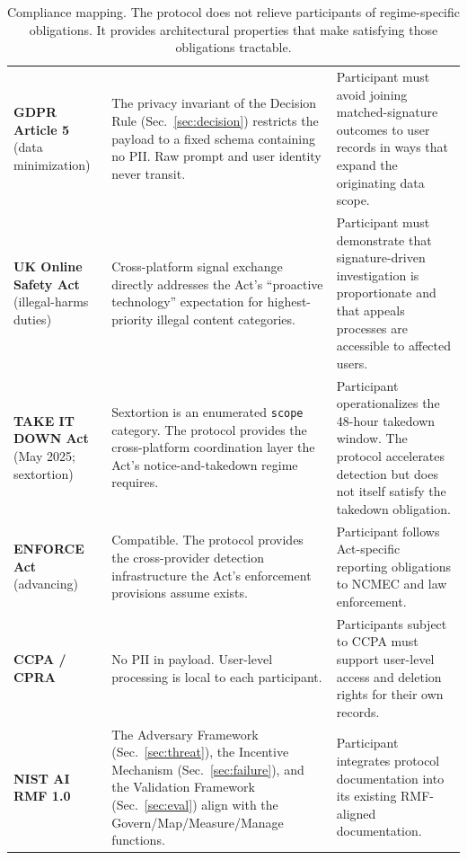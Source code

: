 \documentclass[11pt]{article}
\begin{document}
\begin{table}[!htbp]
\begin{tabularx}{\textwidth}{@{}p{3.6cm} X X@{}}
\textbf{GDPR Article 5} (data minimization) &
The privacy invariant of the Decision Rule (Sec.~\ref{sec:decision}) restricts the payload to a fixed schema containing no PII. Raw prompt and user identity never transit. &
Participant must avoid joining matched-signature outcomes to user records in ways that expand the originating data scope. \\

\textbf{UK Online Safety Act} (illegal-harms duties) &
Cross-platform signal exchange directly addresses the Act's ``proactive technology'' expectation for highest-priority illegal content categories. &
Participant must demonstrate that signature-driven investigation is proportionate and that appeals processes are accessible to affected users. \\

\textbf{TAKE IT DOWN Act} (May 2025; sextortion) &
Sextortion is an enumerated \texttt{scope} category. The protocol provides the cross-platform coordination layer the Act's notice-and-takedown regime requires. &
Participant operationalizes the 48-hour takedown window. The protocol accelerates detection but does not itself satisfy the takedown obligation. \\

\textbf{ENFORCE Act} (advancing) &
Compatible. The protocol provides the cross-provider detection infrastructure the Act's enforcement provisions assume exists. &
Participant follows Act-specific reporting obligations to NCMEC and law enforcement. \\

\textbf{CCPA / CPRA} &
No PII in payload. User-level processing is local to each participant. &
Participants subject to CCPA must support user-level access and deletion rights for their own records. \\

\textbf{NIST AI RMF 1.0} &
The Adversary Framework (Sec.~\ref{sec:threat}), the Incentive Mechanism (Sec.~\ref{sec:failure}), and the Validation Framework (Sec.~\ref{sec:eval}) align with the Govern/Map/Measure/Manage functions. &
Participant integrates protocol documentation into its existing RMF-aligned documentation. \\

\bottomrule
\end{tabularx}
\caption{Compliance mapping. The protocol does not relieve participants of regime-specific obligations. It provides architectural properties that make satisfying those obligations tractable.}
\label{tab:compliance}
\end{table}
\end{document}
